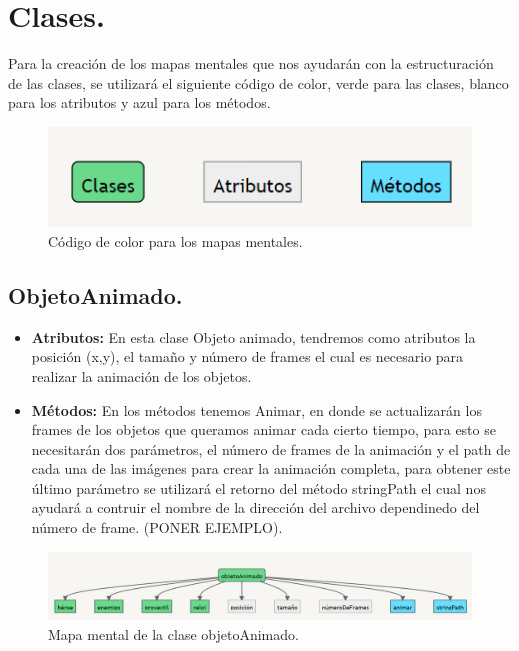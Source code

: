 \documentclass{article}
\begin{document}
\section{Clases.}
Para la creación de los mapas mentales que nos ayudarán con la estructuración de las clases, se utilizará el siguiente código de color, verde para las clases, blanco para los atributos y azul para los métodos.

\begin{figure}[h]
\includegraphics[scale=1]{Images/colores.png}
\centering
\caption{Código de color para los mapas mentales.}
\label{fig:func1}
\end{figure}

\subsection{ObjetoAnimado.}\label{objeto_animado}
\begin{itemize}
  \item \textbf{Atributos:} En esta clase Objeto animado, tendremos como atributos la posición (x,y), el tamaño y número de frames el cual es necesario para realizar la animación de los objetos.
  
  \item \textbf{Métodos:} En los métodos tenemos Animar, en donde se actualizarán los frames de los objetos que queramos animar cada cierto tiempo, para esto se necesitarán dos parámetros, el número de frames de la animación y el path de cada una de las imágenes para crear la animación completa, para obtener este último parámetro se utilizará el retorno del método stringPath el cual nos ayudará a contruir el nombre de la dirección del archivo dependinedo del número de frame. (PONER EJEMPLO).
\end{itemize}

\begin{figure}[h]
\includegraphics[scale=0.5]{Images/ObjetoAnimado.png}
\centering
\caption{Mapa mental de la clase objetoAnimado.}
\label{fig:func1}
\end{figure}
\end{document}
